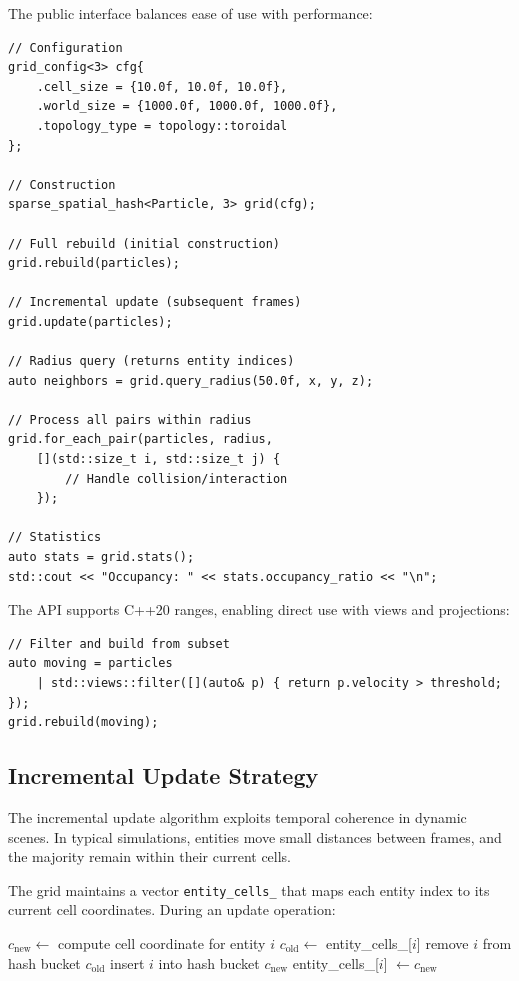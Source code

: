\documentclass[11pt]{article}
\begin{document}
The public interface balances ease of use with performance:

\begin{lstlisting}[caption={Core API example}]
// Configuration
grid_config<3> cfg{
    .cell_size = {10.0f, 10.0f, 10.0f},
    .world_size = {1000.0f, 1000.0f, 1000.0f},
    .topology_type = topology::toroidal
};

// Construction
sparse_spatial_hash<Particle, 3> grid(cfg);

// Full rebuild (initial construction)
grid.rebuild(particles);

// Incremental update (subsequent frames)
grid.update(particles);

// Radius query (returns entity indices)
auto neighbors = grid.query_radius(50.0f, x, y, z);

// Process all pairs within radius
grid.for_each_pair(particles, radius,
    [](std::size_t i, std::size_t j) {
        // Handle collision/interaction
    });

// Statistics
auto stats = grid.stats();
std::cout << "Occupancy: " << stats.occupancy_ratio << "\n";
\end{lstlisting}

The API supports C++20 ranges, enabling direct use with views and projections:

\begin{lstlisting}[caption={Range support example}]
// Filter and build from subset
auto moving = particles
    | std::views::filter([](auto& p) { return p.velocity > threshold; });
grid.rebuild(moving);
\end{lstlisting}

\subsection{Incremental Update Strategy}

The incremental update algorithm exploits temporal coherence in dynamic scenes. In typical simulations, entities move small distances between frames, and the majority remain within their current cells.

The grid maintains a vector \texttt{entity\_cells\_} that maps each entity index to its current cell coordinates. During an update operation:

\begin{algorithm}
\caption{Incremental Update Algorithm}
\begin{algorithmic}[1]
    \State $c_{\text{new}} \gets$ compute cell coordinate for entity $i$
    \State $c_{\text{old}} \gets$ entity\_cells\_[$i$]
        \State remove $i$ from hash bucket $c_{\text{old}}$
        \State insert $i$ into hash bucket $c_{\text{new}}$
        \State entity\_cells\_[$i$] $\gets c_{\text{new}}$
    \EndIf
\EndFor
\end{algorithmic}
\end{algorithm}
\end{document}
